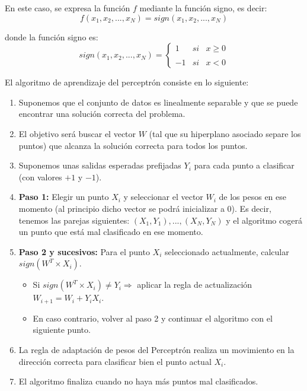 \documentclass[a4paper, 11pt]{article} %
\begin{document}
En este caso, se expresa la función $f$ mediante la función signo, es decir:
\[
f(x_1, x_2, ..., x_N) = sign(x_1, x_2, ..., x_N)
\]

donde la función signo es:
\[
sign(x_1, x_2, ..., x_N) = \left\{ \begin{array}{lcc}
             1 &   si  & x \geq 0 \\
             \\ -1 &  si  &  x < 0
             \end{array}
   \right.
\]

El algoritmo de aprendizaje del perceptrón consiste en lo siguiente:
\begin{enumerate}
    \item Suponemos que el conjunto de datos es linealmente separable y que se puede encontrar una solución correcta del problema.
    \item El objetivo será buscar el vector $W$ (tal que su hiperplano asociado separe los puntos) que alcanza la solución correcta para todos los puntos.
    \item Suponemos unas salidas esperadas prefijadas $Y_i$ para cada punto a clasificar (con valores $+1$ y $-1$).
    \item \textbf{Paso 1:} Elegir un punto $X_i$ y seleccionar el vector $W_i$ de los pesos en ese momento (al principio dicho vector se podrá inicializar a $0$). Es decir, tenemos las parejas siguientes: ${(X_1, Y_1), ..., (X_N, Y_N)}$ y el algoritmo cogerá un punto que está mal clasificado en ese momento.
    \item \textbf{Paso 2 y sucesivos:} Para el punto $X_i$ seleccionado actualmente, calcular $sign(W^T \times X_i)$.
    \begin{itemize}
        \item Si $sign(W^T \times X_i) \neq Y_i \Rightarrow$ aplicar la regla de actualización $W_{i+1} = W_i + Y_iX_i$.
        \item En caso contrario, volver al paso 2 y continuar el algoritmo con el siguiente punto.
    \end{itemize}
    \item La regla de adaptación de pesos del Perceptrón realiza un movimiento en la dirección correcta para clasificar bien el punto actual $X_i$.
    \item El algoritmo finaliza cuando no haya más puntos mal clasificados.
\end{enumerate}
\end{document}
